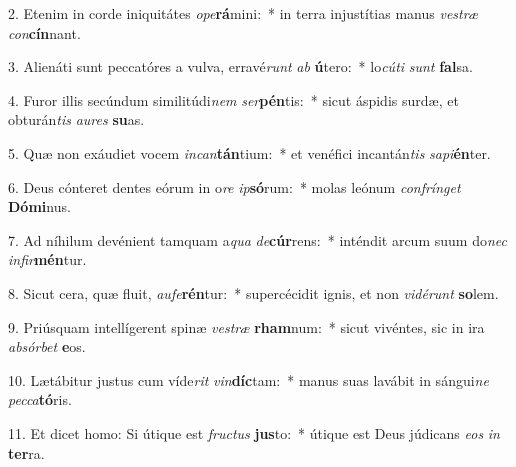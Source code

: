 2. Etenim in corde iniquitátes \textit{o}\textit{pe}\textbf{rá}mini:~*  in terra injustítias manus \textit{ves}\textit{træ} \textit{con}\textbf{cín}nant.\

3. Alienáti sunt peccatóres a vulva, erravé\textit{runt} \textit{ab} \textbf{ú}tero:~*  lo\textit{cú}\textit{ti} \textit{sunt} \textbf{fal}sa.\

4. Furor illis secúndum similitúdi\textit{nem} \textit{ser}\textbf{pén}tis:~*  sicut áspidis surdæ, et obturán\textit{tis} \textit{au}\textit{res} \textbf{su}as.\

5. Quæ non exáudiet vocem \textit{in}\textit{can}\textbf{tán}tium:~*  et venéfici incantán\textit{tis} \textit{sa}\textit{pi}\textbf{én}ter.\

6. Deus cónteret dentes eórum in o\textit{re} \textit{ip}\textbf{só}rum:~*  molas leónum \textit{con}\textit{frín}\textit{get} \textbf{Dó}\textbf{mi}nus.\

7. Ad níhilum devénient tamquam a\textit{qua} \textit{de}\textbf{cúr}rens:~*  inténdit arcum suum do\textit{nec} \textit{in}\textit{fir}\textbf{mén}tur.\

8. Sicut cera, quæ fluit, \textit{au}\textit{fe}\textbf{rén}tur:~*  supercécidit ignis, et non \textit{vi}\textit{dé}\textit{runt} \textbf{so}lem.\

9. Priúsquam intellígerent spinæ \textit{ves}\textit{træ} \textbf{rham}num:~*  sicut vivéntes, sic in ira \textit{ab}\textit{sór}\textit{bet} \textbf{e}os.\

10. Lætábitur justus cum víde\textit{rit} \textit{vin}\textbf{díc}tam:~*  manus suas lavábit in sángui\textit{ne} \textit{pec}\textit{ca}\textbf{tó}ris.\

11. Et dicet homo: Si útique est \textit{fruc}\textit{tus} \textbf{jus}to:~*  útique est Deus júdicans \textit{e}\textit{os} \textit{in} \textbf{ter}ra.\

